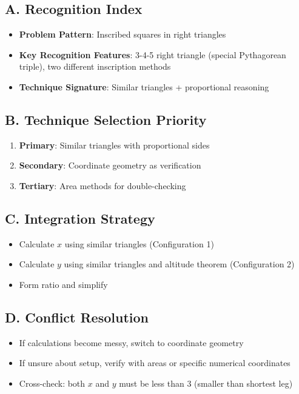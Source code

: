 \documentclass[]{article}
\begin{document}
\begin{techniquesbox}
\subsection*{A. Recognition Index}
\begin{itemize}[leftmargin=*]
    \item \textbf{Problem Pattern}: Inscribed squares in right triangles
    \item \textbf{Key Recognition Features}: 3-4-5 right triangle (special Pythagorean triple), two different inscription methods
    \item \textbf{Technique Signature}: Similar triangles + proportional reasoning
\end{itemize}

\subsection*{B. Technique Selection Priority}
\begin{enumerate}[leftmargin=*]
    \item \textbf{Primary}: Similar triangles with proportional sides
    \item \textbf{Secondary}: Coordinate geometry as verification
    \item \textbf{Tertiary}: Area methods for double-checking
\end{enumerate}

\subsection*{C. Integration Strategy}
\begin{itemize}[leftmargin=*]
    \item Calculate $x$ using similar triangles (Configuration 1)
    \item Calculate $y$ using similar triangles and altitude theorem (Configuration 2)
    \item Form ratio and simplify
\end{itemize}

\subsection*{D. Conflict Resolution}
\begin{itemize}[leftmargin=*]
    \item If calculations become messy, switch to coordinate geometry
    \item If unsure about setup, verify with areas or specific numerical coordinates
    \item Cross-check: both $x$ and $y$ must be less than 3 (smaller than shortest leg)
\end{itemize}
\end{techniquesbox}
\end{document}

